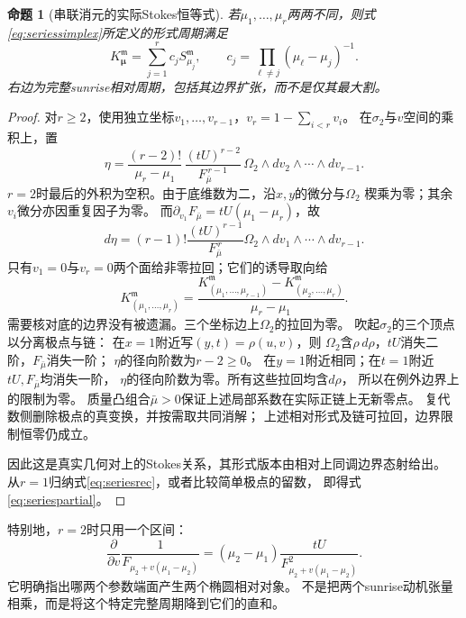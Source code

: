 \documentclass[11pt,a4paper]{ctexart}
\theoremstyle{cnplain}\newtheorem{theorem}{定理}[section]
\newtheorem{proposition}[theorem]{命题}
\theoremstyle{definition}\newtheorem{definition}[theorem]{定义}
\theoremstyle{remark}\newtheorem{remark}[theorem]{注}
\begin{document}
\begin{proposition}[串联消元的实际Stokes恒等式]\label{prop:seriesstokes}
若$\mu_1,\ldots,\mu_r$两两不同，则式\eqref{eq:seriessimplex}所定义的形式周期满足
\begin{equation}\label{eq:seriespartial}
 K_{\boldsymbol\mu}^{\mathfrak m}
 =\sum_{j=1}^r c_jS_{\mu_j}^{\mathfrak m},
 \qquad c_j=\prod_{\ell\ne j}(\mu_\ell-\mu_j)^{-1}.
\end{equation}
右边为完整sunrise相对周期，包括其边界扩张，而不是仅其最大割。
\end{proposition}
\begin{proof}
对$r\ge2$，使用独立坐标$v_1,\ldots,v_{r-1}$，$v_r=1-\sum_{i<r}v_i$。
在$\sigma_2$与$v$空间的乘积上，置
\[
 \eta=\frac{(r-2)!}{\mu_r-\mu_1}\,
 \frac{(tU)^{r-2}}{F_{\bar\mu}^{\,r-1}}\,
 \Omega_2\wedge dv_2\wedge\cdots\wedge dv_{r-1}.
\]
$r=2$时最后的外积为空积。由于底维数为二，沿$x,y$的微分与$\Omega_2$
楔乘为零；其余$v_i$微分亦因重复因子为零。
而$\partial_{v_1}F_{\bar\mu}=tU(\mu_1-\mu_r)$，故
\[
 d\eta=(r-1)!\frac{(tU)^{r-1}}{F_{\bar\mu}^{\,r}}
       \Omega_2\wedge dv_1\wedge\cdots\wedge dv_{r-1}.
\]
只有$v_1=0$与$v_r=0$两个面给非零拉回；它们的诱导取向给
\begin{equation}\label{eq:seriesrec}
 K_{(\mu_1,\ldots,\mu_r)}^{\mathfrak m}
 =\frac{K_{(\mu_1,\ldots,\mu_{r-1})}^{\mathfrak m}
        -K_{(\mu_2,\ldots,\mu_r)}^{\mathfrak m}}
       {\mu_r-\mu_1}.
\end{equation}
需要核对底的边界没有被遗漏。三个坐标边上$\Omega_2$的拉回为零。
吹起$\sigma_2$的三个顶点以分离极点与链：
在$x=1$附近写$(y,t)=\rho(u,v)$，则
$\Omega_2$含$\rho\,d\rho$，$tU$消失二阶，$F_{\bar\mu}$消失一阶；
$\eta$的径向阶数为$r-2\ge0$。
在$y=1$附近相同；在$t=1$附近$tU,F_{\bar\mu}$均消失一阶，
$\eta$的径向阶数为零。所有这些拉回均含$d\rho$，
所以在例外边界上的限制为零。
质量凸组合$\bar\mu>0$保证上述局部系数在实际正链上无新零点。
复代数侧删除极点的真变换，并按需取共同消解；
上述相对形式及链可拉回，边界限制恒零仍成立。

因此这是真实几何对上的Stokes关系，其形式版本由相对上同调边界态射给出。
从$r=1$归纳式\eqref{eq:seriesrec}，或者比较简单极点的留数，
即得式\eqref{eq:seriespartial}。
\end{proof}

特别地，$r=2$时只用一个区间：
\[
 \frac{\partial}{\partial v}\frac1{F_{\mu_2+v(\mu_1-\mu_2)}}
 =(\mu_2-\mu_1)\frac{tU}{F_{\mu_2+v(\mu_1-\mu_2)}^2}.
\]
它明确指出哪两个参数端面产生两个椭圆相对对象。
不是把两个sunrise动机张量相乘，而是将这个特定完整周期降到它们的直和。
\end{document}
